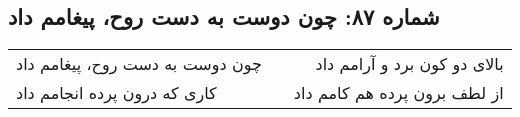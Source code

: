 \begin{center}
\section*{شماره ۸۷: چون دوست به دست روح، پیغامم داد}
\label{sec:087}
\begin{longtable}{l p{0.5cm} r}
چون دوست به دست روح، پیغامم داد
&&
بالای دو کون برد و آرامم داد
\\
کاری که درون پرده انجامم داد
&&
از لطف برون پرده هم کامم داد
\\
\end{longtable}
\end{center}
